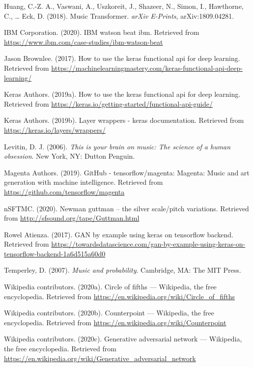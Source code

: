 \documentclass[12pt,oneside]{chicagocapstone}
\begin{document}
\leavevmode\hypertarget{ref-2018arXiv180904281H}{}%
Huang, C.-Z. A., Vaswani, A., Uszkoreit, J., Shazeer, N., Simon, I., Hawthorne, C., \ldots{} Eck, D. (2018). Music Transformer. \emph{arXiv E-Prints}, arXiv:1809.04281.

\leavevmode\hypertarget{ref-watson}{}%
IBM Corporation. (2020). IBM watson beat \textbar{} ibm. Retrieved from \url{https://www.ibm.com/case-studies/ibm-watson-beat}

\leavevmode\hypertarget{ref-keras_func_api_tutorial}{}%
Jason Brownlee. (2017). How to use the keras functional api for deep learning. Retrieved from \url{https://machinelearningmastery.com/keras-functional-api-deep-learning/}

\leavevmode\hypertarget{ref-keras_func_api}{}%
Keras Authors. (2019a). How to use the keras functional api for deep learning. Retrieved from \url{https://keras.io/getting-started/functional-api-guide/}

\leavevmode\hypertarget{ref-keras_wrappers}{}%
Keras Authors. (2019b). Layer wrappers - keras documentation. Retrieved from \url{https://keras.io/layers/wrappers/}

\leavevmode\hypertarget{ref-levitin2006}{}%
Levitin, D. J. (2006). \emph{This is your brain on music: The science of a human obsession}. New York, NY: Dutton Penguin.

\leavevmode\hypertarget{ref-magenta}{}%
Magenta Authors. (2019). GitHub - tensorflow/magenta: Magenta: Music and art generation with machine intelligence. Retrieved from \url{https://github.com/tensorflow/magenta}

\leavevmode\hypertarget{ref-silver_scale}{}%
nSFTMC. (2020). Newman guttman -- the silver scale/pitch variations. Retrieved from \url{http://sfsound.org/tape/Guttman.html}

\leavevmode\hypertarget{ref-gan_example}{}%
Rowel Atienza. (2017). GAN by example using keras on tensorflow backend. Retrieved from \url{https://towardsdatascience.com/gan-by-example-using-keras-on-tensorflow-backend-1a6d515a60d0}

\leavevmode\hypertarget{ref-temperley2007}{}%
Temperley, D. (2007). \emph{Music and probability}. Cambridge, MA: The MIT Press.

\leavevmode\hypertarget{ref-wiki_circle_of_fifths}{}%
Wikipedia contributors. (2020a). Circle of fifths --- Wikipedia, the free encyclopedia. Retrieved from \url{https://en.wikipedia.org/wiki/Circle_of_fifths}

\leavevmode\hypertarget{ref-wiki_counterpoint}{}%
Wikipedia contributors. (2020b). Counterpoint --- Wikipedia, the free encyclopedia. Retrieved from \url{https://en.wikipedia.org/wiki/Counterpoint}

\leavevmode\hypertarget{ref-wiki_gan}{}%
Wikipedia contributors. (2020c). Generative adversarial network --- Wikipedia, the free encyclopedia. Retrieved from \url{https://en.wikipedia.org/wiki/Generative_adversarial_network}


\end{document}
